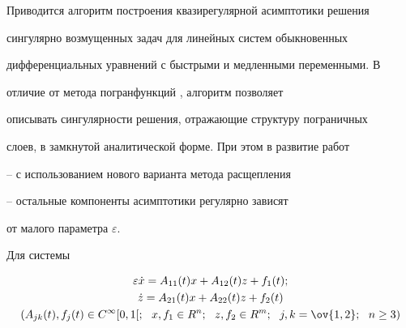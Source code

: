  


\date{} 




\pagestyle{plain} %


 




\maketitle 


\label{begin} 


 


Приводится алгоритм построения квазирегулярной асимптотики решения 


сингулярно возмущенных задач для линейных систем обыкновенных 


дифференциальных уравнений с быстрыми и медленными переменными. В 


отличие от метода погранфункций \cite{1}, \cite{2} алгоритм позволяет 


описывать сингулярности решения, отражающие структуру пограничных 


слоев, в замкнутой аналитической форме. При этом в развитие работ 


\cite{3}--\cite{8} с использованием нового варианта метода расщепления 


\cite{4}--\cite{9} остальные компоненты асимптотики регулярно зависят 


от малого параметра $\varepsilon$. 


 


Для системы 


\begin{gather} 


\varepsilon\Dot x=A_{11}(t)x+A_{12}(t)z+f_1(t);\notag\\ 


% 


\Dot z=A_{21}(t)x+A_{22}(t)z+f_2(t)\\ 


% 


(A_{j k}(t),f_j(t)\in C^\infty[0,1[;\ \ x,f_1\in R^n; 


\ \ z,f_2\in R^m;\ \ j,k=\ov{1,2};\ \ n\ge3)\notag 


\end{gather} 


